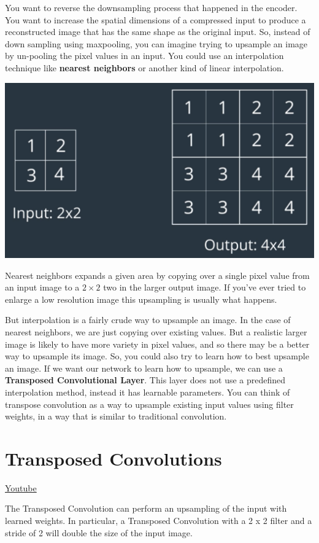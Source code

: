 You want to reverse the downsampling process that happened in the encoder. You want to increase the spatial dimensions of a compressed input to produce a reconstructed image that has the same shape as the original input. So, instead of down sampling using maxpooling, you can imagine trying to upsample an image by un-pooling the pixel values in an input.
You could use an interpolation technique like \textbf{nearest neighbors} or another kind of linear interpolation.

\includegraphics[width=0.5\linewidth]{img//cnn//autoencoders/upsamplingNN.png}

Nearest neighbors expands a given area by copying over a single pixel value from an input image to a \(2 \times 2\) two in the larger output image. If you've ever tried to enlarge a low resolution image this upsampling is usually what happens. \newline

But interpolation is a fairly crude way to upsample an image. In the case of nearest neighbors, we are just copying over existing values. But a realistic larger image is likely to have more variety in pixel values, and so there may be a better way to upsample its image. So, you could also try to learn how to best upsample an image. If we want our network to learn how to upsample, we can use a \textbf{Transposed Convolutional Layer}. This layer does not use a predefined interpolation method, instead it has learnable parameters. You can think of transpose convolution as a way to upsample existing input values using filter weights, in a way that is similar to traditional convolution.


\section{Transposed Convolutions}
\href{https://www.youtube.com/watch?v=hnnLAC1Q0zg&t=3s&ab_channel=Udacity}{Youtube} \newline

The Transposed Convolution can perform an upsampling of the input with learned weights. In particular, a Transposed Convolution with a 2 x 2 filter and a stride of 2 will double the size of the input image. \newline

